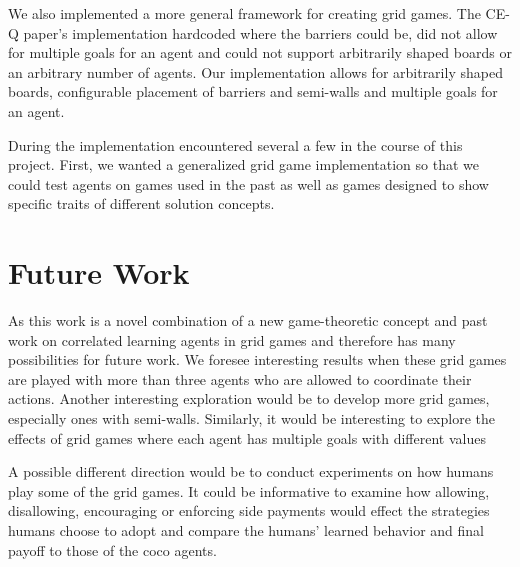 We also implemented a more general framework for creating grid games. The CE-Q paper's implementation hardcoded where the barriers could be, did not allow for multiple goals for an agent and could not support arbitrarily shaped boards or an arbitrary number of agents. Our implementation allows for arbitrarily shaped boards, configurable placement of barriers and semi-walls and multiple goals for an agent.

During the implementation encountered several a few in the course of this project. First, we wanted a generalized grid game implementation so that we could test agents on games used in the past as well as games designed to show specific traits of different solution concepts. 

\section{Future Work}
\hspace{5mm}As this work is a novel combination of a new game-theoretic concept and past work on correlated learning agents in grid games and therefore has many possibilities for future work. We foresee interesting results when these grid games are played with more than three agents who are allowed to coordinate their actions. Another interesting exploration would be to develop more grid games, especially ones with semi-walls. Similarly, it would be interesting to explore the effects of grid games where each agent has multiple goals with different values

A possible different direction would be to conduct experiments on how humans play some of the grid games. It could be informative to examine how allowing, disallowing, encouraging or enforcing side payments would effect the strategies humans choose to adopt and compare the humans' learned behavior and final payoff to those of the coco agents.